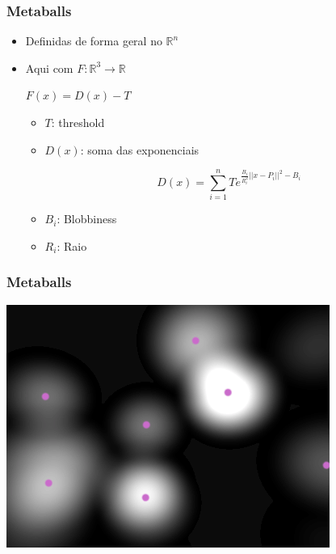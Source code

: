 \documentclass[brazil]{beamer}
\begin{document}
    \begin{frame}
      \frametitle{Metaballs}
      \begin{itemize}
        \item Definidas de forma geral no $\mathbb{R}^n$
        \item Aqui com $F:\mathbb{R}^3 \to \mathbb{R}$
        \vspace{.5em}
        \begin{center}
          $F(x) = D(x) - T$
        \end{center}
        \begin{itemize}
          \item $T$: threshold
          \item $D(x)$: soma das exponenciais
            \vspace{-1.0em}
            \begin{center}
              $$D(x) = \sum_{i = 1}^n Te^{\frac{B_i}{R_i^2}||x-P_i||^2-B_i} $$
            \end{center}
          \item $B_i$: Blobbiness
          \item $R_i$: Raio
        \end{itemize}
      \end{itemize}
    \end{frame}
      
    \begin{frame}
      \frametitle{Metaballs}
        \begin{center}
          \includegraphics[width=.7\textwidth]{imgs/metaball-2d-1.png}
        \end{center}
    \end{frame}
\end{document}
